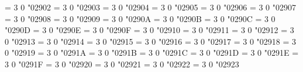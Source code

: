 \Umathchardef\nvLeftarrow = 3 0 "02902 %
\Umathchardef\nvRightarrow = 3 0 "02903 %
\Umathchardef\nvLeftrightarrow = 3 0 "02904 %
\Umathchardef\twoheadmapsto = 3 0 "02905 %
\Umathchardef\Mapsfrom = 3 0 "02906 %
\Umathchardef\Mapsto = 3 0 "02907 %
\Umathchardef\downarrowbarred = 3 0 "02908 %
\Umathchardef\uparrowbarred = 3 0 "02909 %
\Umathchardef\Uuparrow = 3 0 "0290A %
\Umathchardef\Ddownarrow = 3 0 "0290B %
\Umathchardef\leftbkarrow = 3 0 "0290C %
\Umathchardef\rightbkarrow = 3 0 "0290D %
\Umathchardef\leftdbkarrow = 3 0 "0290E %
\Umathchardef\dbkarrow = 3 0 "0290F %
\Umathchardef\drbkarrow = 3 0 "02910 %
\Umathchardef\rightdotarrow = 3 0 "02911 %
\Umathchardef\baruparrow = 3 0 "02912 %
\Umathchardef\downarrowbar = 3 0 "02913 %
\Umathchardef\nvrightarrowtail = 3 0 "02914 %
\Umathchardef\nVrightarrowtail = 3 0 "02915 %
\Umathchardef\twoheadrightarrowtail = 3 0 "02916 %
\Umathchardef\nvtwoheadrightarrowtail = 3 0 "02917 %
\Umathchardef\nVtwoheadrightarrowtail = 3 0 "02918 %
\Umathchardef\lefttail = 3 0 "02919 %
\Umathchardef\righttail = 3 0 "0291A %
\Umathchardef\leftdbltail = 3 0 "0291B %
\Umathchardef\rightdbltail = 3 0 "0291C %
\Umathchardef\diamondleftarrow = 3 0 "0291D %
\Umathchardef\rightarrowdiamond = 3 0 "0291E %
\Umathchardef\diamondleftarrowbar = 3 0 "0291F %
\Umathchardef\barrightarrowdiamond = 3 0 "02920 %
\Umathchardef\nwsearrow = 3 0 "02921 %
\Umathchardef\neswarrow = 3 0 "02922 %
\Umathchardef\hknwarrow = 3 0 "02923 %
